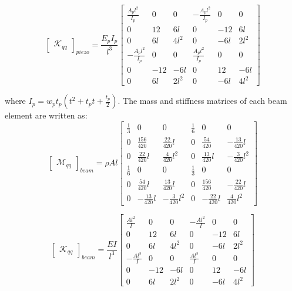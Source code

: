 \documentclass{ifacconf}
\begin{document}
\begin{equation}
\label{eq:k}
\begin{bmatrix}
\mathcal{K}_{qq}
\end{bmatrix}_{piezo} = \frac{E_pI_p}{l^3}\begin{bmatrix}
 \frac{A_pl^2}{I_p} & 0 & 0 & -\frac{A_pl^2}{I_p} & 0 & 0\\ 0 & 12 & 6l &0  &-12 & 6l \\ 0 & 6l & 4l^2 & 0 & -6l & 2l^2 \\ -\frac{A_pl^2}{I_p} & 0 & 0 & \frac{A_pl^2}{I_p} &0 & 0 \\  0 & -12 & -6l & 0 & 12 & -6l \\ 0 & 6l & 2l^2 & 0 & -6l & 4l^2
\end{bmatrix}
\end{equation}

where $I_p = w_pt_p(t^2 + t_pt + \frac{t_p}{2})$. The mass and stiffness matrices of each beam element are written as:
\begin{equation}
\label{eq:m}
\begin{bmatrix}
\mathcal{M}_{qq}
\end{bmatrix}_{beam} = \rho A l\begin{bmatrix}
 \frac{1}{3} & 0 & 0 & \frac{1}{6} & 0 & 0\\ 0 & \frac{156}{420} & \frac{22}{420}l &0  &\frac{54}{420} & -\frac{13}{420}l \\ 0 & \frac{22}{420}l & \frac{4}{420}l^2 & 0 & \frac{13}{420}l & - \frac{3}{420}l^2 \\ \frac{1}{6} & 0 & 0 & \frac{1}{3} &0 & 0 \\  0 & \frac{54}{420}l & \frac{13}{420}l & 0 & \frac{156}{420} & - \frac{22}{420}l \\ 0 & -\frac{13}{420}l & -\frac{3}{420}l^2 & 0 & -\frac{22}{420}l & \frac{4}{420}l^2
\end{bmatrix}
\end{equation}

\begin{equation}
\label{eq:k}
\begin{bmatrix}
\mathcal{K}_{qq}
\end{bmatrix}_{beam} = \frac{EI}{l^3}\begin{bmatrix}
 \frac{A l^2}{I} & 0 & 0 & -\frac{A l^2}{I} & 0 & 0\\ 0 & 12 & 6l &0  &-12 & 6l \\ 0 & 6l & 4l^2 & 0 & -6l & 2l^2 \\ -\frac{A l^2}{I} & 0 & 0 & \frac{A l^2}{I} &0 & 0 \\  0 & -12 & -6l & 0 & 12 & -6l \\ 0 & 6l & 2l^2 & 0 & -6l & 4l^2
\end{bmatrix}
\end{equation}
\end{document}
